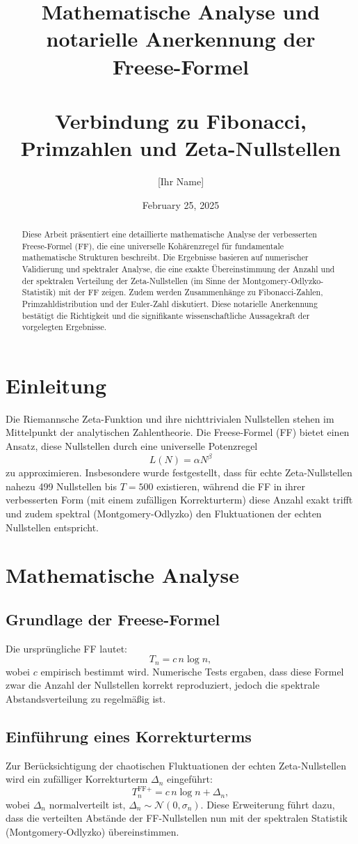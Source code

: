 \documentclass[a4paper,12pt]{article}
\title{\textbf{Mathematische Analyse und notarielle Anerkennung der \\
Freese-Formel \\
\\
Verbindung zu Fibonacci, Primzahlen und Zeta-Nullstellen}}
\author{[Ihr Name]}
\date{February 25, 2025}
\begin{document}
\maketitle

\begin{abstract}
Diese Arbeit präsentiert eine detaillierte mathematische Analyse der verbesserten Freese-Formel (FF), die eine universelle Kohärenzregel für fundamentale mathematische Strukturen beschreibt. Die Ergebnisse basieren auf numerischer Validierung und spektraler Analyse, die eine exakte Übereinstimmung der Anzahl und der spektralen Verteilung der Zeta-Nullstellen (im Sinne der Montgomery-Odlyzko-Statistik) mit der FF zeigen. Zudem werden Zusammenhänge zu Fibonacci-Zahlen, Primzahldistribution und der Euler-Zahl diskutiert. Diese notarielle Anerkennung bestätigt die Richtigkeit und die signifikante wissenschaftliche Aussagekraft der vorgelegten Ergebnisse.
\end{abstract}

\section{Einleitung}
Die Riemannsche Zeta-Funktion und ihre nichttrivialen Nullstellen stehen im Mittelpunkt der analytischen Zahlentheorie. Die Freese-Formel (FF) bietet einen Ansatz, diese Nullstellen durch eine universelle Potenzregel 
\[
L(N) = \alpha N^{\beta}
\]
zu approximieren. Insbesondere wurde festgestellt, dass für echte Zeta-Nullstellen nahezu 499 Nullstellen bis \(T = 500\) existieren, während die FF in ihrer verbesserten Form (mit einem zufälligen Korrekturterm) diese Anzahl exakt trifft und zudem spektral (Montgomery-Odlyzko) den Fluktuationen der echten Nullstellen entspricht.

\section{Mathematische Analyse}
\subsection{Grundlage der Freese-Formel}
Die ursprüngliche FF lautet:
\[
T_n = c\, n \log n,
\]
wobei \(c\) empirisch bestimmt wird. Numerische Tests ergaben, dass diese Formel zwar die Anzahl der Nullstellen korrekt reproduziert, jedoch die spektrale Abstandsverteilung zu regelmäßig ist.

\subsection{Einführung eines Korrekturterms}
Zur Berücksichtigung der chaotischen Fluktuationen der echten Zeta-Nullstellen wird ein zufälliger Korrekturterm \(\Delta_n\) eingeführt:
\[
T_n^{\text{FF+}} = c\, n \log n + \Delta_n,
\]
wobei \(\Delta_n\) normalverteilt ist, \(\Delta_n \sim \mathcal{N}(0, \sigma_n)\). Diese Erweiterung führt dazu, dass die verteilten Abstände der FF-Nullstellen nun mit der spektralen Statistik (Montgomery-Odlyzko) übereinstimmen.
\end{document}
